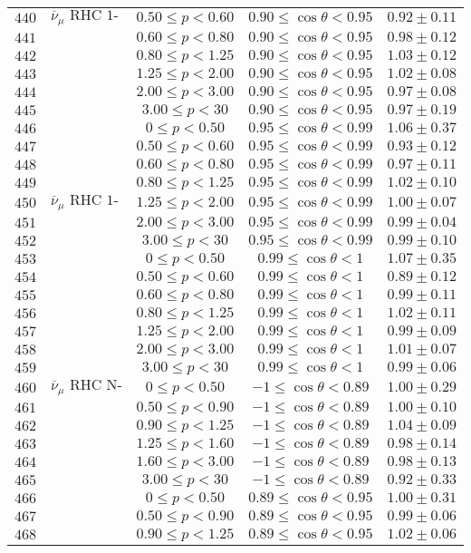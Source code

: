 \begin{longtable}[c]{ccccc}
$440$ & $\overline{\nu}_{\mu}\text{ RHC 1-Trk Air}$ & $0.50\leq p<0.60$ & $0.90\leq\cos\theta<0.95$ & $0.92\pm0.11$\tabularnewline
$441$ &  & $0.60\leq p<0.80$ & $0.90\leq\cos\theta<0.95$ & $0.98\pm0.12$\tabularnewline
$442$ &  & $0.80\leq p<1.25$ & $0.90\leq\cos\theta<0.95$ & $1.03\pm0.12$\tabularnewline
$443$ &  & $1.25\leq p<2.00$ & $0.90\leq\cos\theta<0.95$ & $1.02\pm0.08$\tabularnewline
$444$ &  & $2.00\leq p<3.00$ & $0.90\leq\cos\theta<0.95$ & $0.97\pm0.08$\tabularnewline
$445$ &  & $3.00\leq p<30$ & $0.90\leq\cos\theta<0.95$ & $0.97\pm0.19$\tabularnewline
$446$ &  & $0\leq p<0.50$ & $0.95\leq\cos\theta<0.99$ & $1.06\pm0.37$\tabularnewline
$447$ &  & $0.50\leq p<0.60$ & $0.95\leq\cos\theta<0.99$ & $0.93\pm0.12$\tabularnewline
$448$ &  & $0.60\leq p<0.80$ & $0.95\leq\cos\theta<0.99$ & $0.97\pm0.11$\tabularnewline
$449$ &  & $0.80\leq p<1.25$ & $0.95\leq\cos\theta<0.99$ & $1.02\pm0.10$\tabularnewline
$450$ & $\overline{\nu}_{\mu}\text{ RHC 1-Trk Air}$ & $1.25\leq p<2.00$ & $0.95\leq\cos\theta<0.99$ & $1.00\pm0.07$\tabularnewline
$451$ &  & $2.00\leq p<3.00$ & $0.95\leq\cos\theta<0.99$ & $0.99\pm0.04$\tabularnewline
$452$ &  & $3.00\leq p<30$ & $0.95\leq\cos\theta<0.99$ & $0.99\pm0.10$\tabularnewline
$453$ &  & $0\leq p<0.50$ & $0.99\leq\cos\theta<1$ & $1.07\pm0.35$\tabularnewline
$454$ &  & $0.50\leq p<0.60$ & $0.99\leq\cos\theta<1$ & $0.89\pm0.12$\tabularnewline
$455$ &  & $0.60\leq p<0.80$ & $0.99\leq\cos\theta<1$ & $0.99\pm0.11$\tabularnewline
$456$ &  & $0.80\leq p<1.25$ & $0.99\leq\cos\theta<1$ & $1.02\pm0.11$\tabularnewline
$457$ &  & $1.25\leq p<2.00$ & $0.99\leq\cos\theta<1$ & $0.99\pm0.09$\tabularnewline
$458$ &  & $2.00\leq p<3.00$ & $0.99\leq\cos\theta<1$ & $1.01\pm0.07$\tabularnewline
$459$ &  & $3.00\leq p<30$ & $0.99\leq\cos\theta<1$ & $0.99\pm0.06$\tabularnewline
$460$ & $\overline{\nu}_{\mu}\text{ RHC N-Trks Air}$ & $0\leq p<0.50$ & $-1\leq\cos\theta<0.89$ & $1.00\pm0.29$\tabularnewline
$461$ &  & $0.50\leq p<0.90$ & $-1\leq\cos\theta<0.89$ & $1.00\pm0.10$\tabularnewline
$462$ &  & $0.90\leq p<1.25$ & $-1\leq\cos\theta<0.89$ & $1.04\pm0.09$\tabularnewline
$463$ &  & $1.25\leq p<1.60$ & $-1\leq\cos\theta<0.89$ & $0.98\pm0.14$\tabularnewline
$464$ &  & $1.60\leq p<3.00$ & $-1\leq\cos\theta<0.89$ & $0.98\pm0.13$\tabularnewline
$465$ &  & $3.00\leq p<30$ & $-1\leq\cos\theta<0.89$ & $0.92\pm0.33$\tabularnewline
$466$ &  & $0\leq p<0.50$ & $0.89\leq\cos\theta<0.95$ & $1.00\pm0.31$\tabularnewline
$467$ &  & $0.50\leq p<0.90$ & $0.89\leq\cos\theta<0.95$ & $0.99\pm0.06$\tabularnewline
$468$ &  & $0.90\leq p<1.25$ & $0.89\leq\cos\theta<0.95$ & $1.02\pm0.06$\tabularnewline

\end{longtable}
